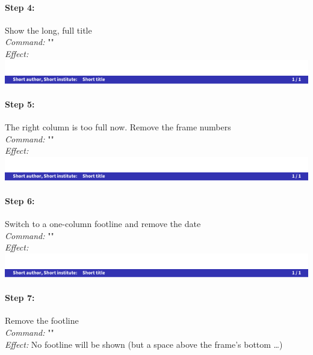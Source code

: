 \documentclass[11pt]{ltxdoc}
\begin{document}
	\paragraph{Step 4:} Show the long, full title \\
	\textit{Command:} "" \\
	\textit{Effect:} \\
	\includegraphics[page=8, width=\textwidth, trim=0 0 0 15, clip]{hackthefootline-examples}
	
	\paragraph{Step 5:} The right column is too full now. Remove the frame numbers \\
	\textit{Command:} "" \\
	\textit{Effect:} \\
	\includegraphics[page=9, width=\textwidth, trim=0 0 0 15, clip]{hackthefootline-examples}
	
	\paragraph{Step 6:} Switch to a one-column footline and remove the date \\
	\textit{Command:} "" \\
	\textit{Effect:} \\
	\includegraphics[page=10, width=\textwidth, trim=0 0 0 15, clip]{hackthefootline-examples}
	
	\paragraph{Step 7:} Remove the footline \\
	\textit{Command:} "" \\
	\textit{Effect:} No footline will be shown (but a space above the frame's bottom …)
\end{document}
